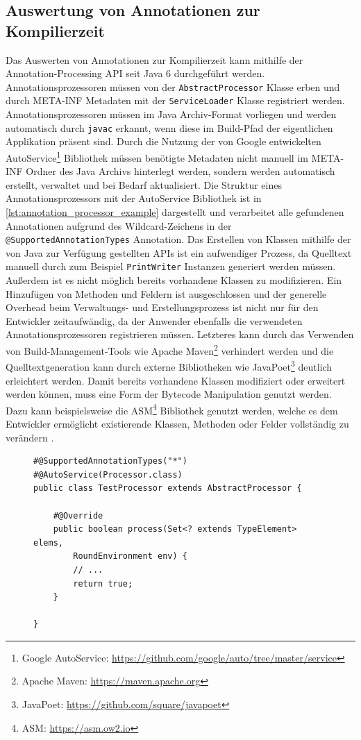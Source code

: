 \subsection{Auswertung von Annotationen zur Kompilierzeit}
Das Auswerten von Annotationen zur Kompilierzeit kann mithilfe der Annotation-Processing API seit Java 6 durchgeführt werden. Annotationsprozessoren müssen von der \texttt{AbstractProcessor} Klasse erben und durch META-INF Metadaten mit der \texttt{ServiceLoader} Klasse registriert werden. Annotationsprozessoren müssen im Java Archiv-Format vorliegen und werden automatisch durch \texttt{javac} erkannt, wenn diese im Build-Pfad der eigentlichen Applikation präsent sind. Durch die Nutzung der von Google entwickelten AutoService\footnote{Google AutoService: \url{https://github.com/google/auto/tree/master/service}} Bibliothek müssen benötigte Metadaten nicht manuell im META-INF Ordner des Java Archivs hinterlegt werden, sondern werden automatisch erstellt, verwaltet und bei Bedarf aktualisiert. Die Struktur eines Annotationsprozessors mit der AutoService Bibliothek ist in \autoref{lst:annotation_processor_example} dargestellt und verarbeitet alle gefundenen Annotationen aufgrund des Wildcard-Zeichens in der \texttt{@SupportedAnnotationTypes} Annotation. Das Erstellen von Klassen mithilfe der von Java zur Verfügung gestellten APIs ist ein aufwendiger Prozess, da Quelltext manuell durch zum Beispiel \texttt{PrintWriter} Instanzen generiert werden müssen. Außerdem ist es nicht möglich bereits vorhandene Klassen zu modifizieren. Ein Hinzufügen von Methoden und Feldern ist ausgeschlossen und der generelle Overhead beim Verwaltungs- und Erstellungsprozess ist nicht nur für den Entwickler zeitaufwändig, da der Anwender ebenfalls die verwendeten Annotationsprozessoren registrieren müssen. Letzteres kann durch das Verwenden von Build-Management-Tools wie Apache Maven\footnote{Apache Maven: \url{https://maven.apache.org}} verhindert werden und die Quelltextgeneration kann durch externe Bibliotheken wie JavaPoet\footnote{JavaPoet: \url{https://github.com/square/javapoet}} deutlich erleichtert werden. Damit bereits vorhandene Klassen modifiziert oder erweitert werden können, muss eine Form der Bytecode Manipulation genutzt werden. Dazu kann beispielsweise die ASM\footnote{ASM: \url{https://asm.ow2.io}} Bibliothek genutzt werden, welche es dem Entwickler ermöglicht existierende Klassen, Methoden oder Felder vollständig zu verändern \cite{Kuleshov2007}.
\begin{figure}[H]
	\begin{lstlisting}[caption={Beispiel -- Annotationsprozessor.}, captionpos=b, label=lst:annotation_processor_example]
#@SupportedAnnotationTypes("*")
#@AutoService(Processor.class)
public class TestProcessor extends AbstractProcessor {
	
	#@Override
	public boolean process(Set<? extends TypeElement> elems,
		RoundEnvironment env) {
		// ...
		return true;
	}
	
}
	\end{lstlisting}
\end{figure}